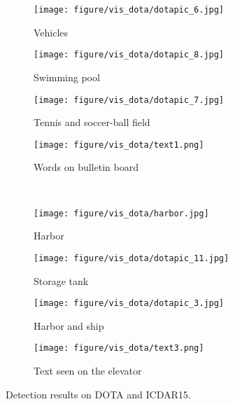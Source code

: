 \documentclass[10pt,twocolumn,letterpaper]{article}
\begin{document}
\begin{figure*}[t]
    \centering
    \begin{subfigure}{.23\textwidth}
        \centering    
        \texttt{[image: figure/vis\_dota/dotapic\_6.jpg]}
        \caption{Vehicles}
    \end{subfigure}
    \begin{subfigure}{.23\textwidth}
        \centering            
        \texttt{[image: figure/vis\_dota/dotapic\_8.jpg]}
        \caption{Swimming pool}
    \end{subfigure}
    \begin{subfigure}{.23\textwidth}
        \centering    
        \texttt{[image: figure/vis\_dota/dotapic\_7.jpg]}
        \caption{Tennis and soccer-ball field}
    \end{subfigure}
    \begin{subfigure}{.23\textwidth}
        \centering    
        \texttt{[image: figure/vis\_dota/text1.png]}
        \caption{Words on bulletin board}
    \end{subfigure}
    \\
    \begin{subfigure}{.23\textwidth}
        \centering    
        \texttt{[image: figure/vis\_dota/harbor.jpg]}
        \caption{Harbor}
    \end{subfigure}    
    \begin{subfigure}{.23\textwidth}
        \centering    
        \texttt{[image: figure/vis\_dota/dotapic\_11.jpg]}
        \caption{Storage tank}
    \end{subfigure}
    \begin{subfigure}{.23\textwidth}
        \centering    
        \texttt{[image: figure/vis\_dota/dotapic\_3.jpg]}
        \caption{Harbor and ship}
    \end{subfigure}
   \begin{subfigure}{.23\textwidth}
        \centering            
        \texttt{[image: figure/vis\_dota/text3.png]}
        \caption{Text seen on the elevator}
    \end{subfigure}
    \vspace{-5pt}
    \caption{Detection results on DOTA and ICDAR15.}
    \label{fig:dota_vis}
    \vspace{-8pt}
\end{figure*}
\end{document}
